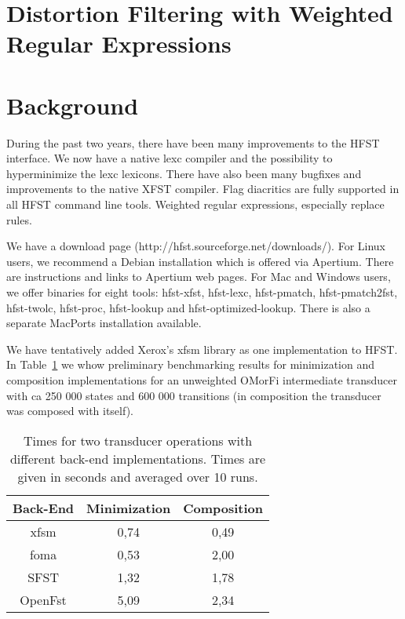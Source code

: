 \documentclass{llncs}
\begin{document}
\section{Distortion Filtering with Weighted Regular Expressions}

\section{Background}\label{sec:background}
During the past two years, there have been many improvements to the HFST 
interface. We now have a native lexc compiler and the possibility to 
hyperminimize the lexc lexicons. There have also been many bugfixes and 
improvements to the native XFST compiler. Flag diacritics are fully supported 
in all HFST command line tools. Weighted regular expressions, especially replace rules.

We have a download page (http://hfst.sourceforge.net/downloads/). For Linux 
users, we recommend a Debian installation which is offered via Apertium. There
are instructions and links to Apertium web pages. For Mac and Windows users,
we offer binaries for eight tools: hfst-xfst, hfst-lexc, hfst-pmatch,
hfst-pmatch2fst, hfst-twolc, hfst-proc, hfst-lookup and hfst-optimized-lookup.
There is also a separate MacPorts installation available.

We have tentatively added Xerox's xfsm library as one implementation to HFST.
In Table~\ref{operationtimes} we whow preliminary benchmarking results for
minimization and composition implementations for an unweighted OMorFi intermediate
transducer with ca 250 000 states and 600 000 transitions (in composition the transducer was composed
with itself).

\begin{table}[h!]
  \centering
  \caption{Times for two transducer operations with different back-end implementations.
    Times are given in seconds and averaged over 10 runs.}
  \begin{tabular}{c c c }
    \hline
    Back-End & Minimization & Composition \\ \hline
    xfsm & 0,74 & 0,49 \\
    foma & 0,53 & 2,00 \\
    SFST & 1,32 & 1,78 \\
    OpenFst & 5,09 & 2,34 \\ \hline
  \end{tabular}
  \label{operationtimes}
\end{table}
\end{document}
